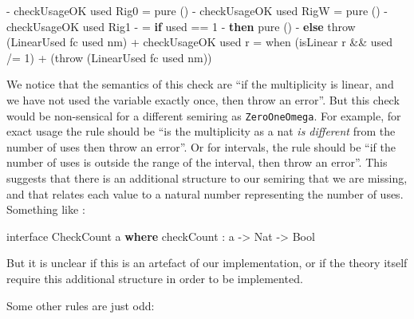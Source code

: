 \documentclass[
]{article}
\newenvironment{Shaded}{}{}
\newcommand{\DataTypeTok}[1]{\textcolor[rgb]{0.56,0.13,0.00}{#1}}
\newcommand{\DecValTok}[1]{\textcolor[rgb]{0.25,0.63,0.44}{#1}}
\newcommand{\FunctionTok}[1]{\textcolor[rgb]{0.02,0.16,0.49}{#1}}
\newcommand{\KeywordTok}[1]{\textcolor[rgb]{0.00,0.44,0.13}{\textbf{#1}}}
\newcommand{\NormalTok}[1]{#1}
\newcommand{\OperatorTok}[1]{\textcolor[rgb]{0.40,0.40,0.40}{#1}}
\newcommand{\OtherTok}[1]{\textcolor[rgb]{0.00,0.44,0.13}{#1}}
\begin{document}
\begin{Shaded}
\begin{Highlighting}[]
\OperatorTok{{-}}\NormalTok{ checkUsageOK used }\DataTypeTok{Rig0} \OtherTok{=} \FunctionTok{pure}\NormalTok{ ()}
\OperatorTok{{-}}\NormalTok{ checkUsageOK used }\DataTypeTok{RigW} \OtherTok{=} \FunctionTok{pure}\NormalTok{ ()}
\OperatorTok{{-}}\NormalTok{ checkUsageOK used }\DataTypeTok{Rig1}
\OperatorTok{{-}}          \OtherTok{=} \KeywordTok{if}\NormalTok{ used }\OperatorTok{==} \DecValTok{1}
\OperatorTok{{-}}               \KeywordTok{then} \FunctionTok{pure}\NormalTok{ ()}
\OperatorTok{{-}}               \KeywordTok{else}\NormalTok{ throw (}\DataTypeTok{LinearUsed}\NormalTok{ fc used nm)}
\OperatorTok{+}\NormalTok{ checkUsageOK used r }\OtherTok{=}\NormalTok{ when (isLinear r }\OperatorTok{\&\&}\NormalTok{ used }\OperatorTok{/=} \DecValTok{1}\NormalTok{)}
\OperatorTok{+}\NormalTok{                            (throw (}\DataTypeTok{LinearUsed}\NormalTok{ fc used nm))}
\end{Highlighting}
\end{Shaded}

We notice that the semantics of this check are ``if the multiplicity is
linear, and we have not used the variable exactly once, then throw an
error''. But this check would be non-sensical for a different semiring
as \texttt{ZeroOneOmega}. For example, for exact usage the rule should
be ``is the multiplicity as a nat \emph{is different} from the number of
uses then throw an error''. Or for intervals, the rule should be ``if
the number of uses is outside the range of the interval, then throw an
error''. This suggests that there is an additional structure to our
semiring that we are missing, and that relates each value to a natural
number representing the number of uses. Something like :

\begin{Shaded}
\begin{Highlighting}[]
\NormalTok{interface }\DataTypeTok{CheckCount}\NormalTok{ a }\KeywordTok{where}
\NormalTok{    checkCount }\OperatorTok{:}\NormalTok{ a }\OtherTok{{-}\textgreater{}} \DataTypeTok{Nat} \OtherTok{{-}\textgreater{}} \DataTypeTok{Bool}
\end{Highlighting}
\end{Shaded}

But it is unclear if this is an artefact of our implementation, or if
the theory itself require this additional structure in order to be
implemented.

Some other rules are just odd:
\end{document}
